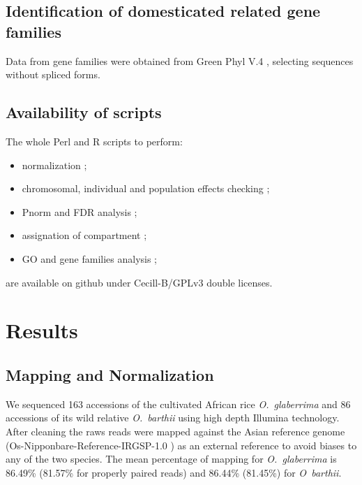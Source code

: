 \documentclass[10pt,letterpaper]{article}
\begin{document}
  \subsection*{Identification of domesticated related gene families}
  Data from gene families were obtained from Green Phyl V.4  \cite{Conte2008b, Conte2008a, Rouard2011}, selecting sequences without spliced forms.
  
  \newpage
  \subsection*{Availability of scripts}
  The whole Perl and R scripts to perform:
  \begin{itemize}
   \item normalization ;
   \item chromosomal, individual and population effects checking ;
   \item Pnorm and FDR analysis ;
   \item assignation of compartment ;
   \item GO and gene families analysis ;
  \end{itemize}
  are available on github under Cecill-B/GPLv3 double licenses.

\section*{Results}
\subsection*{Mapping and Normalization}
We sequenced 163 accessions of the cultivated African rice \emph{O.~glaberrima} and 86 accessions of its wild relative \emph{O.~barthii} using high depth Illumina technology. After cleaning the raws reads were mapped against the Asian reference genome (Os-Nipponbare-Reference-IRGSP-1.0 \cite{Mcnally2009, Kawahara2013}) as an external reference to avoid biases to any of the two species. The mean percentage of mapping for \emph{O.~glaberrima} is 86.49\% (81.57\% for properly paired reads) and 86.44\% (81.45\%) for \emph{O~barthii}.
\end{document}
